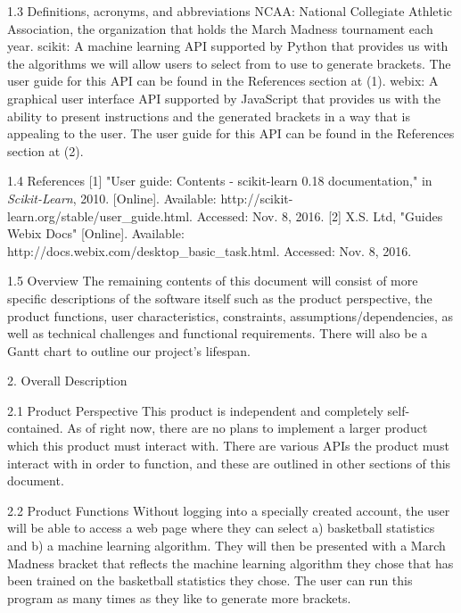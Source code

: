 \documentclass[letterpaper, 10pt,titlepage]{article}
\begin{document}
\begin{section}{1.3 Definitions, acronyms, and abbreviations}
NCAA: National Collegiate Athletic Association, the organization that holds the March Madness tournament each year.
scikit: A machine learning API supported by Python that provides us with the algorithms we will allow users to select from to use to generate brackets. The user guide for this API can be found in the References section at (1).
webix: A graphical user interface API supported by JavaScript that provides us with the ability to present instructions and the generated brackets in a way that is appealing to the user. The user guide for this API can be found in the References section at (2).
\end{section}

\begin{section}{1.4 References}
[1] "User guide: Contents - scikit-learn 0.18 documentation," in \textit{Scikit-Learn}, 2010. [Online]. Available: http://scikit-learn.org/stable/user_guide.html. Accessed: Nov. 8, 2016.
[2] X.S. Ltd, "Guides Webix Docs" [Online]. Available: http://docs.webix.com/desktop_basic_task.html. Accessed: Nov. 8, 2016. 
\end{section}

\begin{section}{1.5 Overview}
The remaining contents of this document will consist of more specific descriptions of the software itself such as the product perspective, the product functions, user characteristics, constraints, assumptions/dependencies, as well as technical challenges and functional requirements. There will also be a Gantt chart to outline our project's lifespan.
\end{section}

\begin{section}{2. Overall Description}
\end{section}

\begin{section}{2.1 Product Perspective}
This product is independent and completely self-contained. As of right now, there are no plans to implement a larger product which this product must interact with. There are various APIs the product must interact with in order to function, and these are outlined in other sections of this document.
\end{section}

\begin{section}{2.2 Product Functions}
Without logging into a specially created account, the user will be able to access a web page where they can select a) basketball statistics and b) a machine learning algorithm. They will then be presented with a March Madness bracket that reflects the machine learning algorithm they chose that has been trained on the basketball statistics they chose. The user can run this program as many times as they like to generate more brackets. 
\end{section}
\end{document}
